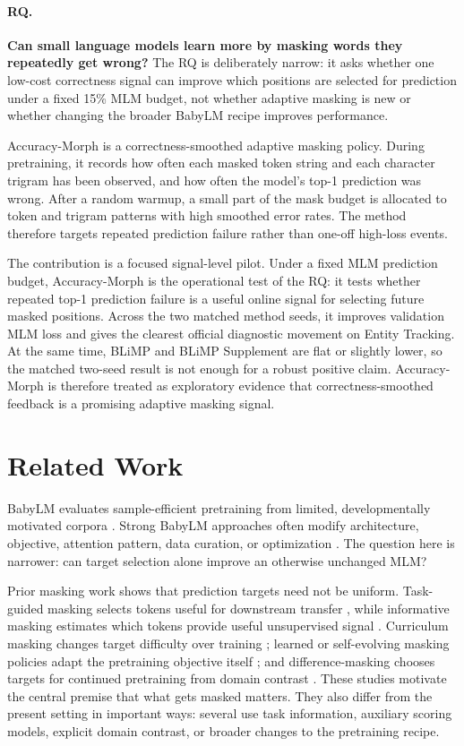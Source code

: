 \documentclass[11pt]{article}
\begin{document}
\paragraph{RQ.}
\textbf{Can small language models learn more by masking words they repeatedly get wrong?}
The RQ is deliberately narrow: it asks whether one low-cost correctness signal can improve which positions are selected for prediction under a fixed 15\% MLM budget, not whether adaptive masking is new or whether changing the broader BabyLM recipe improves performance.

Accuracy-Morph is a correctness-smoothed adaptive masking policy.
During pretraining, it records how often each masked token string and each character trigram has been observed, and how often the model's top-1 prediction was wrong.
After a random warmup, a small part of the mask budget is allocated to token and trigram patterns with high smoothed error rates.
The method therefore targets repeated prediction failure rather than one-off high-loss events.

The contribution is a focused signal-level pilot.
Under a fixed MLM prediction budget, Accuracy-Morph is the operational test of the RQ: it tests whether repeated top-1 prediction failure is a useful online signal for selecting future masked positions.
Across the two matched method seeds, it improves validation MLM loss and gives the clearest official diagnostic movement on Entity Tracking.
At the same time, BLiMP and BLiMP Supplement are flat or slightly lower, so the matched two-seed result is not enough for a robust positive claim.
Accuracy-Morph is therefore treated as exploratory evidence that correctness-smoothed feedback is a promising adaptive masking signal.

\section{Related Work}

BabyLM evaluates sample-efficient pretraining from limited, developmentally motivated corpora \citep{warstadt2023babylm,hu2024babylm,choshen2026babylm}.
Strong BabyLM approaches often modify architecture, objective, attention pattern, data curation, or optimization \citep{charpentier2024gptbert,yu2024antlm,haller2025sample,kosmopoulou2025masked}.
The question here is narrower: can target selection alone improve an otherwise unchanged MLM?

Prior masking work shows that prediction targets need not be uniform.
Task-guided masking selects tokens useful for downstream transfer \citep{gu2020train}, while informative masking estimates which tokens provide useful unsupervised signal \citep{sadeq2022informask}.
Curriculum masking changes target difficulty over training \citep{lee2022efficient}; learned or self-evolving masking policies adapt the pretraining objective itself \citep{yang2023learning,zhong2023self}; and difference-masking chooses targets for continued pretraining from domain contrast \citep{wilf2023difference}.
These studies motivate the central premise that what gets masked matters.
They also differ from the present setting in important ways: several use task information, auxiliary scoring models, explicit domain contrast, or broader changes to the pretraining recipe.
\end{document}
